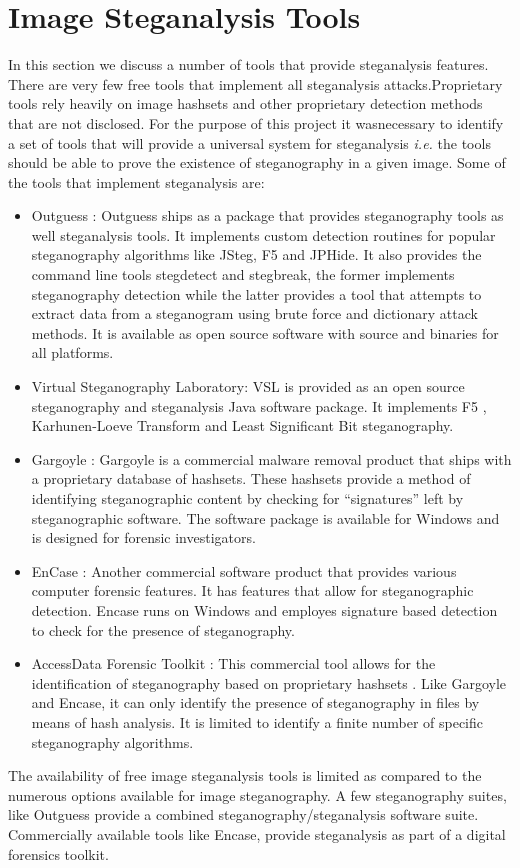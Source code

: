 \section{Image Steganalysis Tools}
\label{sec:steganalysistools}
In this section we discuss a number of tools that provide steganalysis features. There are very few free tools that implement all steganalysis attacks.Proprietary tools rely heavily on image hashsets and other proprietary detection methods that are not disclosed. For the purpose of this project it wasnecessary to identify a set of tools that will provide a universal system for steganalysis \emph{i.e.} the tools should be able to prove the existence of steganography in a given image. Some of the tools that implement steganalysis are:
\begin{itemize}
\item Outguess : Outguess \cite{outguess} ships as a package that provides steganography tools as well steganalysis tools. It implements custom detection routines for popular steganography algorithms like JSteg, F5 and JPHide. It also provides the command line tools stegdetect and stegbreak, the former implements steganography detection while the latter provides a tool that attempts to extract data from a steganogram using brute force and dictionary attack methods. It is available as open source software with source and binaries for all platforms. 
\item Virtual Steganography Laboratory: VSL \cite{wegrzyn2009} is provided as an open source steganography and steganalysis Java software package. It implements F5 \cite{westfeld2001f5}, Karhunen-Loeve Transform \cite{stanescu2007digital} and Least Significant Bit steganography.
\item Gargoyle : Gargoyle \cite{gargoyle} is a commercial malware removal product that ships with a proprietary database of hashsets. These hashsets provide a method of identifying steganographic content by checking for ``signatures'' left by steganographic software. The software package is available for Windows and is designed for forensic investigators.
\item EnCase : Another commercial software product \cite{encase} that provides various  computer forensic features. It has features that allow for steganographic detection. Encase runs on Windows and employes signature based detection to check for the presence of steganography.
\item AccessData Forensic Toolkit :  This commercial tool allows for the identification of steganography based on proprietary hashsets \cite{ftk}. Like Gargoyle and Encase, it can only identify the presence of steganography in files by means of hash analysis. It is limited to identify a finite number of specific steganography algorithms. 
 
\end{itemize}
The availability of free image steganalysis tools is limited as compared to the numerous options available for image steganography. A few steganography suites, like Outguess \cite{outguess} provide a combined steganography/steganalysis software suite. Commercially available tools like Encase, provide steganalysis as part of a digital forensics toolkit.  

